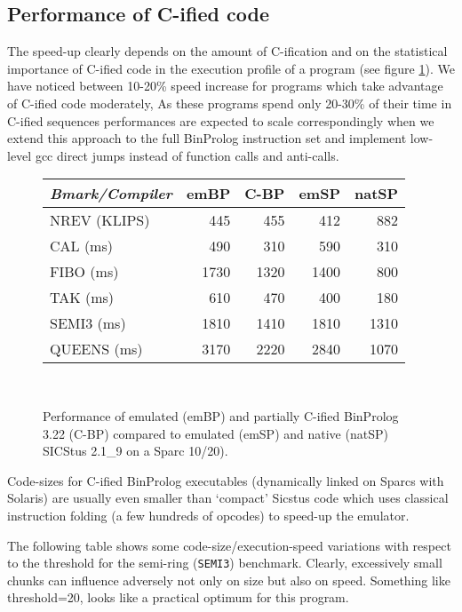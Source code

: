 \documentclass{article}
\begin{document}
\subsection{Performance of C-ified code}

The speed-up clearly depends on the amount of C-ification
and on the statistical importance of C-ified code in
the execution profile of a program (see figure \ref{bm}).
We have noticed between 10-20\% speed increase for
programs which take advantage of C-ified code moderately,
As these programs spend only 20-30\% of their time
in C-ified sequences performances are expected
to scale correspondingly when
we extend this approach to the full BinProlog 
instruction set and implement low-level
gcc direct jumps instead
of function calls and anti-calls.


\begin{figure}
\begin{center}
\begin{tabular}{||l||r|r||r|r||}
\hline
\hline
\multicolumn{1}{|c|}{{\em Bmark/Compiler}} &
  \multicolumn{1}{c|}{emBP} &
  \multicolumn{1}{c|}{C-BP} &
  \multicolumn{1}{c|}{emSP} &
  \multicolumn{1}{c|}{natSP} \\
\hline
\hline
 NREV (KLIPS) & 445 &455 &412 &882   \\\hline
 CAL (ms) & 490 &310  &590  &310   \\\hline
 FIBO (ms) & 1730& 1320 &1400 &800  \\\hline
 TAK (ms) & 610 &470 &400 &180  \\\hline
 SEMI3 (ms) & 1810 &1410 &1810 &1310  \\\hline
 QUEENS (ms) & 3170 &2220 &2840 &1070  \\\hline
\hline
\hline
\end{tabular} \\
\medskip
\caption{Performance of emulated (emBP) and partially
C-ified BinProlog 3.22 (C-BP)
compared to emulated (emSP) and native (natSP) SICStus 2.1\_9 
on a Sparc 10/20).
 \label{bm}}
\end{center}
\end{figure}

Code-sizes for C-ified BinProlog executables (dynamically linked
on Sparcs with Solaris) are usually even
smaller than `compact' Sicstus code
which uses classical instruction
folding (a few hundreds of opcodes) to speed-up the emulator.

The following table shows some code-size/execution-speed 
variations with respect to the threshold for
the semi-ring ({\tt SEMI3}) benchmark. Clearly, excessively
small chunks can influence adversely not only on
size but also on speed. Something like threshold=20,
looks like a practical optimum
for this program.
\end{document}
